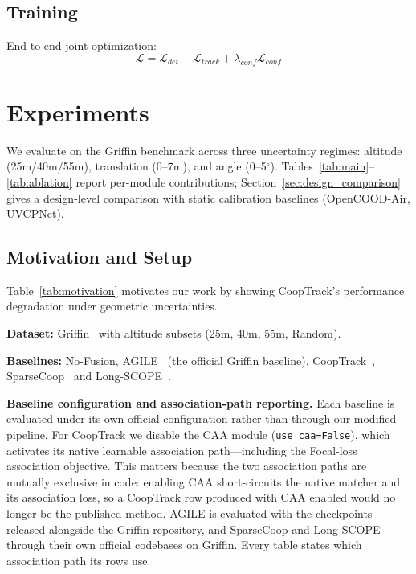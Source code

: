 \documentclass[9.5pt,twocolumn,a4paper]{IEEEtran}
\begin{document}
\subsection{Training}
End-to-end joint optimization:
\begin{equation}
    \mathcal{L} = \mathcal{L}_{det} + \mathcal{L}_{track} + \lambda_{conf} \mathcal{L}_{conf}
    \label{eq:total_loss}
\end{equation}

\section{Experiments}
\label{sec:experiments}

We evaluate on the Griffin benchmark across three uncertainty regimes: altitude (25m/40m/55m), translation (0--7m), and angle (0--5$^\circ$). Tables~\ref{tab:main}--\ref{tab:ablation} report per-module contributions; Section~\ref{sec:design_comparison} gives a design-level comparison with static calibration baselines (OpenCOOD-Air, UVCPNet).

\subsection{Motivation and Setup}

Table~\ref{tab:motivation} motivates our work by showing CoopTrack's performance degradation under geometric uncertainties.

\textbf{Dataset:} Griffin~\cite{griffin} with altitude subsets (25m, 40m, 55m, Random).

\textbf{Baselines:} No-Fusion, AGILE~\cite{griffin} (the official Griffin baseline), CoopTrack~\cite{cooptrack}, SparseCoop~\cite{sparsecoop} and Long-SCOPE~\cite{longscope}.

\noindent\textbf{Baseline configuration and association-path reporting.} Each baseline is evaluated under its own official configuration rather than through our modified pipeline. For CoopTrack we disable the CAA module (\texttt{use\_caa=False}), which activates its native learnable association path---including the Focal-loss association objective. This matters because the two association paths are mutually exclusive in code: enabling CAA short-circuits the native matcher and its association loss, so a CoopTrack row produced with CAA enabled would no longer be the published method. AGILE is evaluated with the checkpoints released alongside the Griffin repository, and SparseCoop and Long-SCOPE through their own official codebases on Griffin. Every table states which association path its rows use.
\end{document}
